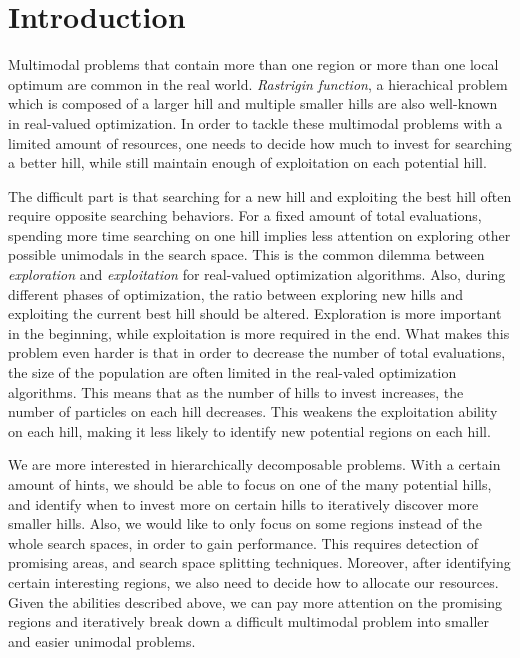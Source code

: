 \chapter{Introduction}
\label{c:intro}

Multimodal problems that contain more than one region or more than one local optimum are common in the real world.
{\em Rastrigin function}, a hierachical problem which is composed of a larger hill and multiple smaller hills are also well-known in real-valued optimization.
In order to tackle these multimodal problems with a limited amount of resources, 
one needs to decide how much to invest for searching a better hill, 
while still maintain enough of exploitation on each potential hill.

The difficult part is that searching for a new hill and exploiting the best hill often require opposite searching behaviors.
For a fixed amount of total evaluations, spending more time searching on one hill implies 
less attention on exploring other possible unimodals in the search space.
This is the common dilemma between {\em exploration} and {\em exploitation} for real-valued optimization algorithms.
Also, during different phases of optimization, 
the ratio between exploring new hills and exploiting the current best hill should be altered.
Exploration is more important in the beginning, while exploitation is more required in the end.
What makes this problem even harder is that in order to decrease the number of total evaluations, 
the size of the population are often limited in the real-valed optimization algorithms.
This means that as the number of hills to invest increases, the number of particles on each hill decreases.
This weakens the exploitation ability on each hill, making it less likely to identify new potential regions on each hill.

We are more interested in hierarchically decomposable problems.
With a certain amount of hints, we should be able to focus on one of the many potential hills, 
and identify when to invest more on certain hills to iteratively discover more smaller hills.
Also, we would like to only focus on some regions instead of the whole search spaces, in order to gain performance.
This requires detection of promising areas, and search space splitting techniques.
Moreover, after identifying certain interesting regions, we also need to decide how to allocate our resources.
Given the abilities described above, 
we can pay more attention on the promising regions and 
iteratively break down a difficult multimodal problem into smaller and easier unimodal problems.

